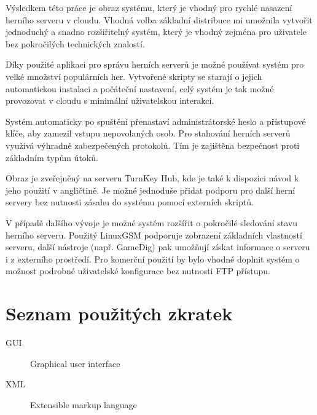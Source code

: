 \documentclass[thesis=B,czech]{FITthesis}[2019/12/23]
\begin{document}
\begin{conclusion}
    Výsledkem této práce je obraz systému, který je vhodný pro rychlé nasazení herního serveru v cloudu.
    Vhodná volba základní distribuce mi umožnila vytvořit jednoduchý a snadno rozšiřitelný systém,
    který je vhodný zejména pro uživatele bez pokročilých technických znalostí.

    Díky použité aplikaci pro správu herních serverů je možné používat systém pro velké množství populárních her.
    Vytvořené skripty se starají o jejich automatickou instalaci a počáteční nastavení, celý systém je tak
    možné provozovat v cloudu s minimální uživatelskou interakcí.

    Systém automaticky po spuštění přenastaví administrátorské heslo a přístupové klíče, aby zamezil vstupu
    nepovolaných osob. Pro stahování herních serverů využívá výhradně zabezpečených protokolů.
    Tím je zajištěna bezpečnost proti základním typům útoků.

    Obraz je zveřejněný na serveru TurnKey Hub, kde je také k dispozici návod k jeho použití v angličtině.
    Je možné jednoduše přidat podporu pro další herní servery bez nutnosti zásahu do systému pomocí externích skriptů.

    V případě dalšího vývoje je možné systém rozšířit o pokročilé sledování stavu herního serveru. Použitý LinuxGSM podporuje
    zobrazení základních vlastností serveru, další nástroje (např. GameDig) pak umožňují získat informace o serveru i z externího
    prostředí. Pro komerční použití by bylo vhodné doplnit systém o možnost podrobné uživatelské konfigurace bez nutnosti FTP přístupu.
\end{conclusion}

% 
% 

\printbibliography

\appendix

\chapter{Seznam použitých zkratek}
\begin{description}
	\item[GUI] Graphical user interface
	\item[XML] Extensible markup language
\end{description}
\end{document}
